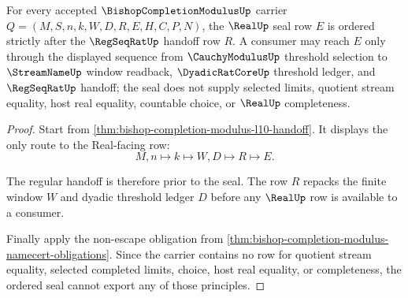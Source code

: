 \begin{theorem}
\label{thm:bishop-completion-modulus-real-seal-ordering}
For every accepted $\BishopCompletionModulusUp$ carrier $Q=(M,S,n,k,W,D,R,E,H,C,P,N)$, the $\RealUp$ seal row $E$ is ordered strictly after the $\RegSeqRatUp$ handoff row $R$. A consumer may reach $E$ only through the displayed sequence from $\CauchyModulusUp$ threshold selection to $\StreamNameUp$ window readback, $\DyadicRatCoreUp$ threshold ledger, and $\RegSeqRatUp$ handoff; the seal does not supply selected limits, quotient stream equality, host real equality, countable choice, or $\RealUp$ completeness.
\end{theorem}
\begin{proof}
Start from \autoref{thm:bishop-completion-modulus-l10-handoff}. It displays the only route to the Real-facing row:
$$
M,n\longmapsto k\longmapsto W,D\longmapsto R\longmapsto E .
$$

The regular handoff is therefore prior to the seal. The row $R$ repacks the finite window $W$ and dyadic threshold ledger $D$ before any $\RealUp$ row is available to a consumer.

Finally apply the non-escape obligation from \autoref{thm:bishop-completion-modulus-namecert-obligations}. Since the carrier contains no row for quotient stream equality, selected completed limits, choice, host real equality, or completeness, the ordered seal cannot export any of those principles.
\end{proof}


